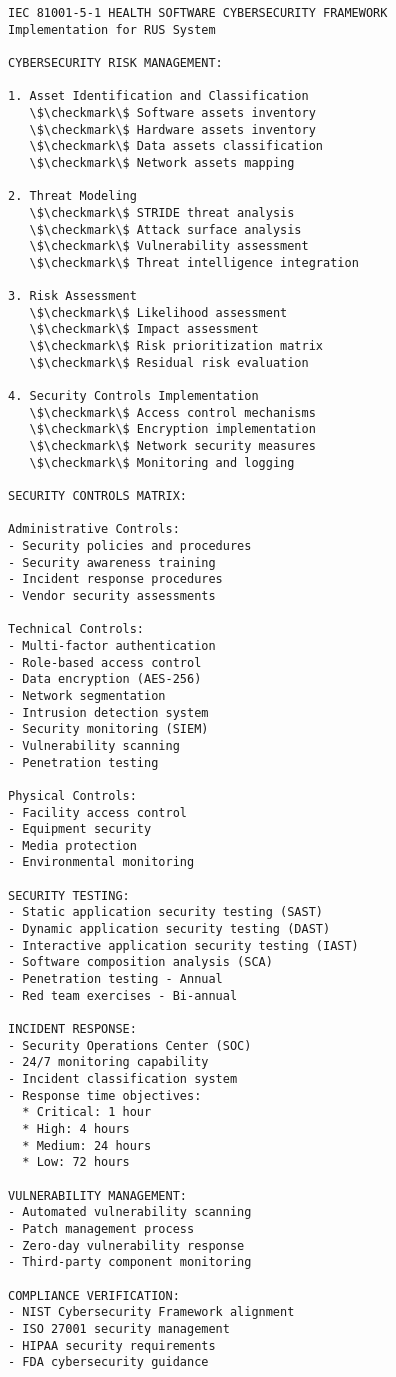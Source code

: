 \begin{lstlisting}[basicstyle=\ttfamily\footnotesize, caption={Cybersecurity Implementation Framework}, label={lst:app-cybersecurity}]
IEC 81001-5-1 HEALTH SOFTWARE CYBERSECURITY FRAMEWORK
Implementation for RUS System

CYBERSECURITY RISK MANAGEMENT:

1. Asset Identification and Classification
   \$\checkmark\$ Software assets inventory
   \$\checkmark\$ Hardware assets inventory
   \$\checkmark\$ Data assets classification
   \$\checkmark\$ Network assets mapping

2. Threat Modeling
   \$\checkmark\$ STRIDE threat analysis
   \$\checkmark\$ Attack surface analysis
   \$\checkmark\$ Vulnerability assessment
   \$\checkmark\$ Threat intelligence integration

3. Risk Assessment
   \$\checkmark\$ Likelihood assessment
   \$\checkmark\$ Impact assessment
   \$\checkmark\$ Risk prioritization matrix
   \$\checkmark\$ Residual risk evaluation

4. Security Controls Implementation
   \$\checkmark\$ Access control mechanisms
   \$\checkmark\$ Encryption implementation
   \$\checkmark\$ Network security measures
   \$\checkmark\$ Monitoring and logging

SECURITY CONTROLS MATRIX:

Administrative Controls:
- Security policies and procedures
- Security awareness training
- Incident response procedures
- Vendor security assessments

Technical Controls:
- Multi-factor authentication
- Role-based access control
- Data encryption (AES-256)
- Network segmentation
- Intrusion detection system
- Security monitoring (SIEM)
- Vulnerability scanning
- Penetration testing

Physical Controls:
- Facility access control
- Equipment security
- Media protection
- Environmental monitoring

SECURITY TESTING:
- Static application security testing (SAST)
- Dynamic application security testing (DAST)
- Interactive application security testing (IAST)
- Software composition analysis (SCA)
- Penetration testing - Annual
- Red team exercises - Bi-annual

INCIDENT RESPONSE:
- Security Operations Center (SOC)
- 24/7 monitoring capability
- Incident classification system
- Response time objectives:
  * Critical: 1 hour
  * High: 4 hours
  * Medium: 24 hours
  * Low: 72 hours

VULNERABILITY MANAGEMENT:
- Automated vulnerability scanning
- Patch management process
- Zero-day vulnerability response
- Third-party component monitoring

COMPLIANCE VERIFICATION:
- NIST Cybersecurity Framework alignment
- ISO 27001 security management
- HIPAA security requirements
- FDA cybersecurity guidance
\end{lstlisting}

